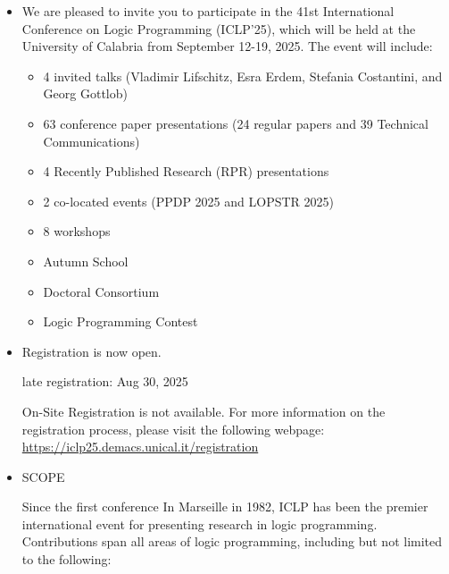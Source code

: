 \documentclass[prodmode,acmtecs]{acmsmall} %
\begin{document}
\begin{itemize}\item  We are pleased to invite you to participate in the 41st International Conference on Logic Programming (ICLP’25), which will be held at the University of Calabria from September 12-19, 2025. The event will include: 
 
\begin{itemize}\item  4 invited talks (Vladimir Lifschitz, Esra Erdem, Stefania Costantini, and Georg Gottlob)
\item  63 conference paper presentations (24 regular papers and 39 Technical Communications)    
\item  4 Recently Published Research (RPR) presentations
\item  2 co-located events (PPDP 2025 and LOPSTR 2025)
\item  8 workshops
\item  Autumn School
\item  Doctoral Consortium
\item  Logic Programming Contest
\end{itemize} 
\item  Registration is now open.  
 
late registration: Aug 30, 2025 
 
  On-Site Registration is not available. For more information on the registration process, please visit the following webpage: \href{https://iclp25.demacs.unical.it/registration}{https://iclp25.demacs.unical.it/registration} 
 
\item  SCOPE 
 
  Since the first conference In Marseille in 1982, ICLP has been the premier international event for presenting research in logic programming. Contributions span all areas of logic programming, including but not limited to the following: 
 

\end{itemize}
\end{document}
